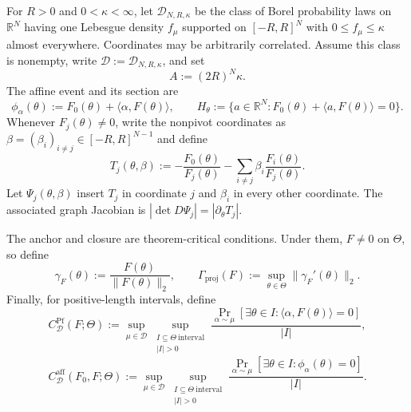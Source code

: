 For $R>0$ and $0<\kappa<\infty$, let $\mathcal D_{N,R,\kappa}$ be the class of Borel probability laws
on $\mathbb R^N$ having one Lebesgue density $f_\mu$ supported on $[-R,R]^N$ with
$0\leq f_\mu\leq\kappa$ almost everywhere. Coordinates may be arbitrarily correlated. Assume this class is
nonempty, write $\mathcal D:=\mathcal D_{N,R,\kappa}$, and set
\begin{equation}
\label{eq:setup-display-006}
A:=(2R)^N\kappa.
\end{equation}
The affine event and its section are
\begin{equation}
\label{eq:setup-display-007}
\phi_\alpha(\theta):=F_0(\theta)+\langle\alpha,F(\theta)\rangle,
\qquad
H_\theta:=\{a\in\mathbb R^N:F_0(\theta)+\langle a,F(\theta)\rangle=0\}.
\end{equation}
Whenever $F_j(\theta)\neq0$, write the nonpivot coordinates as
$\beta=(\beta_i)_{i\neq j}\in[-R,R]^{N-1}$ and define
\begin{equation}
\label{eq:setup-display-008}
T_j(\theta,\beta):=-\frac{F_0(\theta)}{F_j(\theta)}
-\sum_{i\neq j}\beta_i\frac{F_i(\theta)}{F_j(\theta)}.
\end{equation}
Let $\Psi_j(\theta,\beta)$ insert $T_j$ in coordinate $j$ and $\beta_i$ in every other coordinate.
The associated graph Jacobian is $|\det D\Psi_j|=|\partial_\theta T_j|$.

The anchor and closure are theorem-critical conditions. Under them, $F\neq0$ on $\Theta$, so define
\begin{equation}
\label{eq:setup-display-009}
\gamma_F(\theta):=\frac{F(\theta)}{\|F(\theta)\|_2},\qquad
\Gamma_{\mathrm{proj}}(F):=\sup_{\theta\in\Theta}\|\gamma_F'(\theta)\|_2.
\end{equation}
Finally, for positive-length intervals, define
\begin{equation}
\label{eq:setup-display-010}
C^{\mathrm{Pf}}_{\mathcal D}(F;\Theta):=
\sup_{\mu\in\mathcal D}\sup_{\substack{I\subseteq\Theta\ \mathrm{interval}\\|I|>0}}
\frac{\Pr_{\alpha\sim\mu}[\exists\theta\in I:\langle\alpha,F(\theta)\rangle=0]}{|I|},
\end{equation}
\begin{equation}
\label{eq:setup-display-011}
C^{\mathrm{aff}}_{\mathcal D}(F_0,F;\Theta):=
\sup_{\mu\in\mathcal D}\sup_{\substack{I\subseteq\Theta\ \mathrm{interval}\\|I|>0}}
\frac{\Pr_{\alpha\sim\mu}[\exists\theta\in I:\phi_\alpha(\theta)=0]}{|I|}.
\end{equation}

